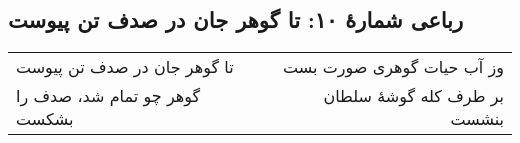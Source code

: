 \begin{center}
\section*{رباعی شمارهٔ ۱۰: تا گوهر جان در صدف تن پیوست}
\label{sec:010}
\begin{longtable}{l p{0.5cm} r}
تا گوهر جان در صدف تن پیوست
&&
وز آب حیات گوهری صورت بست
\\
گوهر چو تمام شد، صدف را بشکست
&&
بر طرف کله گوشهٔ سلطان بنشست
\\
\end{longtable}
\end{center}
